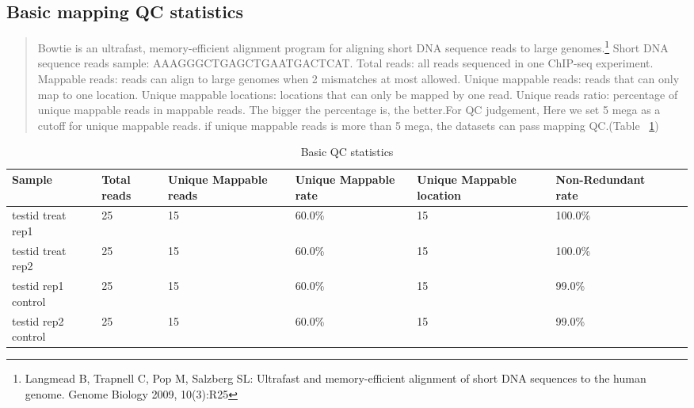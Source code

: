 \documentclass[11pt,a4paper]{article}
\begin{document}
\subsection{Basic mapping QC statistics}
\begin{quotation}
Bowtie is an ultrafast, memory-efficient alignment program for aligning short DNA sequence reads to large genomes.\footnote{Langmead B, Trapnell C, Pop M, Salzberg SL: Ultrafast and memory-efficient alignment of short DNA sequences to the human genome. Genome Biology 2009, 10(3):R25}
Short DNA sequence reads sample: AAAGGGCTGAGCTGAATGACTCAT.
Total reads: all reads sequenced in one ChIP-seq experiment. 
Mappable reads: reads can align to large genomes when 2 mismatches at most allowed.
Unique mappable reads: reads that can only map to one location.
Unique mappable locations: locations that can only be mapped by one read.
Unique reads ratio: percentage of unique mappable reads in mappable reads. The bigger the percentage is, the better.For QC judgement, Here we set 5 mega as a cutoff for unique mappable reads. if unique mappable reads is more than 5 mega, the datasets can pass mapping QC.(Table ~\ref{basicqc})
\end{quotation}
\begin{table}[h]
\caption{Basic QC statistics} \label{basicqc}
\begin{tabularx}{\textwidth}{ |X|X|X|X|X|X|X|X| } 
\hline
Sample & Total reads & Unique Mappable reads & Unique Mappable rate & Unique Mappable location & Non-Redundant rate \\
\hline
testid treat rep1 & 25 & 15 & 60.0\% & 15 & 100.0\% \\
\hline
testid treat rep2 & 25 & 15 & 60.0\% & 15 & 100.0\% \\
\hline
testid rep1 control & 25 & 15 & 60.0\% & 15 & 99.0\% \\
\hline
testid rep2 control & 25 & 15 & 60.0\% & 15 & 99.0\% \\
\hline
\end{tabularx}
\end{table}
\newpage	
\end{document}
